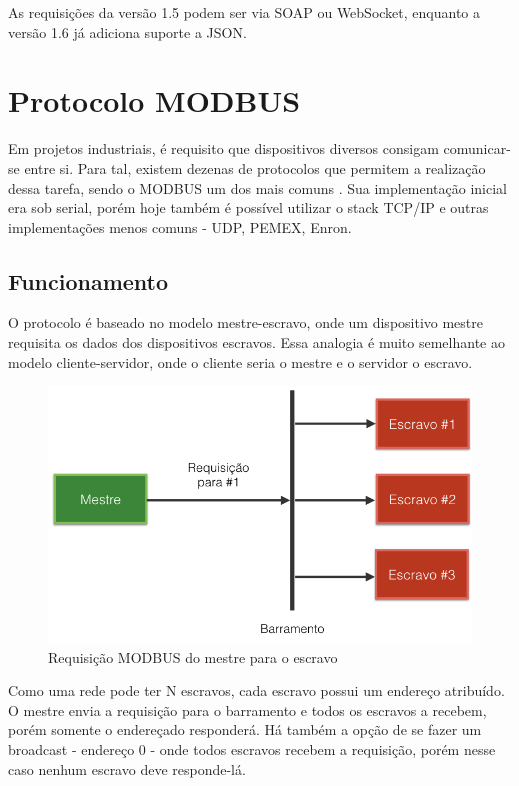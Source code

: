 As requisições da versão 1.5 podem ser via SOAP ou WebSocket, enquanto a versão 1.6 já adiciona suporte a JSON.

\section{Protocolo MODBUS}

Em projetos industriais, é requisito que dispositivos diversos consigam comunicar-se entre si. Para tal, existem dezenas de protocolos que permitem a realização dessa tarefa, sendo o MODBUS um dos mais comuns \cite{modbusspec}. Sua implementação inicial era sob serial, porém hoje também é possível utilizar o stack TCP/IP e outras implementações menos comuns - UDP, PEMEX, Enron.

\subsection{Funcionamento}

O protocolo é baseado no modelo mestre-escravo, onde um dispositivo mestre requisita os dados dos dispositivos escravos. Essa analogia é muito semelhante ao modelo cliente-servidor, onde o cliente seria o mestre e o servidor o escravo.

\begin{figure}[H]
        \begin{center}
                \includegraphics[width=\textwidth,natwidth=1024,natheight=768]{assets/images/modbus-req-1.png}
                \caption{Requisição MODBUS do mestre para o escravo}
                \label{fig:modbus-req-1}
        \end{center}
\end{figure}

Como uma rede pode ter N escravos, cada escravo possui um endereço atribuído. O mestre envia a requisição para o barramento e todos os escravos a recebem, porém somente o endereçado responderá. Há também a opção de se fazer um broadcast - endereço 0 - onde todos escravos recebem a requisição, porém nesse caso nenhum escravo deve responde-lá.

